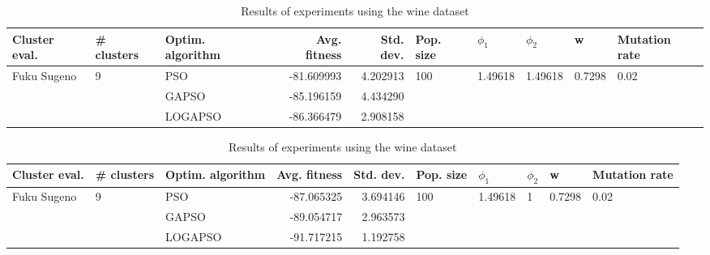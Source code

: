 \documentclass{article}
\begin{document}
\begin{table}
\centering
\caption{Results of experiments using the wine dataset}
\begin{tabular}{lllrrlllll}
\toprule
               Cluster eval. &        \# clusters & Optim. algorithm &  Avg. fitness &  Std. dev. &            Pop. size &               $\phi_{1}$ &               $\phi_{2}$ &                       w &         Mutation rate \\
\midrule
\multirow{3}{*}{Fuku Sugeno} & \multirow{3}{*}{9} &              PSO &    -81.609993 &   4.202913 & \multirow{3}{*}{100} & \multirow{3}{*}{1.49618} & \multirow{3}{*}{1.49618} & \multirow{3}{*}{0.7298} & \multirow{3}{*}{0.02} \\
                             &                    &            GAPSO &    -85.196159 &   4.434290 &                      &                          &                          &                         &                       \\
                             &                    &          LOGAPSO &    -86.366479 &   2.908158 &                      &                          &                          &                         &                       \\
\bottomrule
\end{tabular}
\end{table}
\begin{table}
\centering
\caption{Results of experiments using the wine dataset}
\begin{tabular}{lllrrlllll}
\toprule
               Cluster eval. &        \# clusters & Optim. algorithm &  Avg. fitness &  Std. dev. &            Pop. size &               $\phi_{1}$ &         $\phi_{2}$ &                       w &         Mutation rate \\
\midrule
\multirow{3}{*}{Fuku Sugeno} & \multirow{3}{*}{9} &              PSO &    -87.065325 &   3.694146 & \multirow{3}{*}{100} & \multirow{3}{*}{1.49618} & \multirow{3}{*}{1} & \multirow{3}{*}{0.7298} & \multirow{3}{*}{0.02} \\
                             &                    &            GAPSO &    -89.054717 &   2.963573 &                      &                          &                    &                         &                       \\
                             &                    &          LOGAPSO &    -91.717215 &   1.192758 &                      &                          &                    &                         &                       \\
\bottomrule
\end{tabular}
\end{table}
\end{document}
